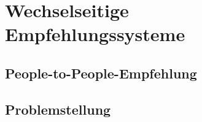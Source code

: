 
\section{Wechselseitige Empfehlungssysteme}
\label{ch:empfehlungssysteme:rrs}

\subsection{People-to-People-Empfehlung}
\label{ch:empfehlungssysteme:rrs:people_to_people}

\subsection{Problemstellung}

